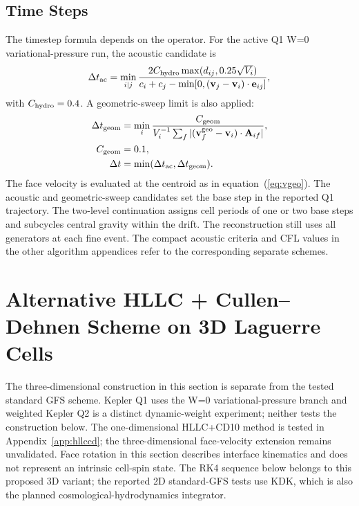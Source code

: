 \documentclass[twocolumn]{aastex63}
\begin{document}
\subsection{Time Steps}
The timestep formula depends on the operator. For the active Q1 W=0
variational-pressure run, the acoustic candidate is
\begin{equation}
  \Delta t_{\rm ac} = \min_{i|j}
  {2 C_{\rm hydro}\max(d_{ij},0.25\sqrt{V_i})\over
   c_i+c_j-\min[0,(\mathbf v_j-\mathbf v_i)\cdot\mathbf e_{ij}]},
\end{equation}
with $C_{\rm hydro}=0.4$. A geometric-sweep limit is also applied:
\begin{equation}
  \begin{aligned}
  \Delta t_{\rm geom} &= \min_i
  {C_{\rm geom}\over V_i^{-1}\sum_f
   |(\mathbf v_f^{\rm geo}-\mathbf v_i)\cdot\mathbf A_{if}|},\\
  C_{\rm geom}&=0.1,\\
  \Delta t&=\min(\Delta t_{\rm ac},\Delta t_{\rm geom}).
  \end{aligned}
\end{equation}
The face velocity is evaluated at the centroid as in equation~(\ref{eq:vgeo}).
The acoustic and geometric-sweep candidates set the base step in the
reported Q1 trajectory. The two-level continuation assigns cell periods
of one or two base steps and subcycles central gravity within the drift.
The reconstruction still uses all generators at each fine event.
The compact acoustic criteria and CFL values in the other algorithm
appendices refer to the corresponding separate schemes.


\section{Alternative HLLC + Cullen--Dehnen Scheme on 3D Laguerre Cells}
\label{sec:hllc3d}

The three-dimensional construction in this section is separate from the tested
standard GFS scheme. Kepler Q1 uses the W=0 variational-pressure branch and
weighted Kepler Q2 is a distinct dynamic-weight experiment; neither tests the
construction below. The
one-dimensional HLLC+CD10 method is tested in Appendix~\ref{app:hllccd}; the
three-dimensional face-velocity extension remains unvalidated. Face rotation
in this section describes interface kinematics and does not represent an
intrinsic cell-spin state. The RK4 sequence below belongs to this proposed 3D
variant; the reported 2D standard-GFS tests use KDK, which is also the planned
cosmological-hydrodynamics integrator.
\end{document}
